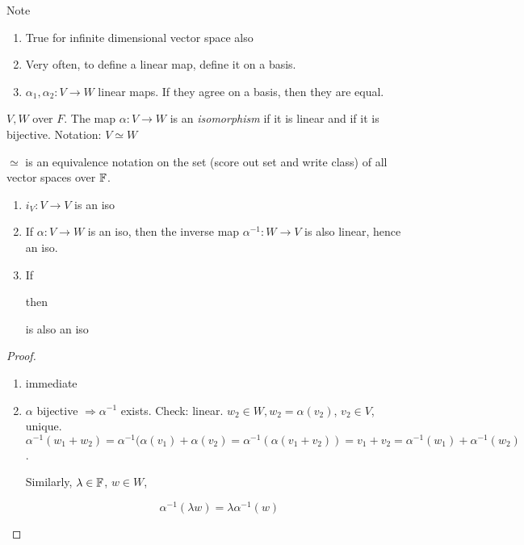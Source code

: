 \documentclass[a4paper]{article}
\begin{document}
Note

\begin{enumerate}
	\item True for infinite dimensional vector space also
	\item Very often, to define a linear map, define it on a basis. 
	\item $ \alpha_{1},\alpha_{2} : V \to W $ linear maps. If they agree on a basis, then they are equal. 
	
\end{enumerate}


\begin{defi}
	$ V,W $ over $ F $. The map $ \alpha : V \to W $ is an \emph{isomorphism} if it is linear and if it is bijective. 
	Notation: $ V \simeq W $
\end{defi}

\begin{lemma} 
	$ \simeq $ is an equivalence notation on the set (score out set and write class) of all vector spaces over $ \mathbb{F} $.
	
	\begin{enumerate}
		\item $ i_{V} : V \to V $ is an iso
		\item If $ \alpha : V \to W $ is an iso, then the inverse map $ \alpha^{-1} : W \to V $ is also linear, hence an iso.
		\item If 
		
		
		
		
	
		then 
		
		
		is also an iso 
		
	\end{enumerate}
	
\end{lemma}

\begin{proof}
	\begin{enumerate}
		\item immediate
		\item $ \alpha $ bijective $ \Rightarrow \alpha^{-1} $ exists. Check: linear. 
		$ w_{2} \in W, w_{2} = \alpha(v_{2}) $, $ v_{2} \in V $, unique.
		$ \alpha^{-1}(w_{1} + w_{2}) = \alpha^{-1}(\alpha(v_{1}) + \alpha(v_{2})  = \alpha^{-1} (\alpha(v_{1} + v_{2})) = v_{1} + v_{2} = \alpha^{-1}(w_{1})  + \alpha^{-1}(w_{2}) $.
		
		Similarly, $ \lambda \in \mathbb{F} $, $ w \in W $, 
		
		\[ \alpha^{-1} (\lambda w) = \lambda \alpha^{-1} (w) \]
		
	\end{enumerate}
\end{proof}
\end{document}
